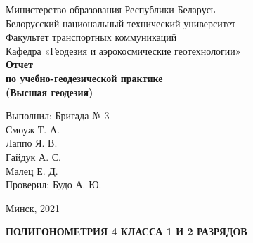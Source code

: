 \documentclass[a4paper]{article}
\begin{document}
\begin{titlepage}
\begin{center}
    \large{Министерство образования Республики Беларусь}\\
\large{Белорусский национальный технический университет}\\
\large{Факультет транспортных коммуникаций}\\
\large{Кафедра «Геодезия и аэрокосмические геотехнологии»}\\
\hfill \break
\hfill \break
\hfill \break
\hfill \break
\hfill \break
\hfill \break
\textbf{\LARGE{Отчет}\\
\Large{по учебно-геодезической практике\\
(Высшая геодезия)\\}}
\hfill \break
\hfill \break
\hfill \break
\end{center}
\begin{flushright}
  \large{Выполнил: Бригада № 3\\
 Смоуж Т. А.\\
 Лаппо Я. В.\\
 Гайдук А. С.\\
 Малец Е. Д.\\
 Проверил: Будо А. Ю.\\}
\end{flushright}
\begin{center}
\hfill \break
\large{Минск, 2021\\}
\end{center}
\end{titlepage}
\setcounter{page}{3}
\begin{center}
    \large{\textbf{ПОЛИГОНОМЕТРИЯ 4 КЛАССА 1 И 2 РАЗРЯДОВ}}
\end{center}
\end{document}
